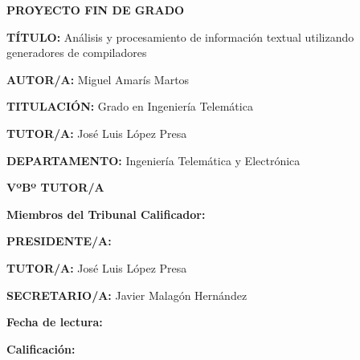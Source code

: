 \vspace{6,5cm}
\begin{center}
	{\fontsize{20}{24} \textbf{PROYECTO FIN DE GRADO} } \\
	
\end{center}
\vspace{1,3cm}
	\begin{adjustwidth}{3cm}{4cm}
		{\fontsize{11}{13,2} 
			{\textbf{TÍTULO:}  Análisis y procesamiento de información textual utilizando
				generadores de compiladores }\vspace{19pt}


			{\textbf{AUTOR/A:} Miguel Amarís Martos}\vspace{19pt}

			{\textbf{TITULACIÓN:} Grado en Ingeniería Telemática}\vspace{19pt}


			{\textbf{TUTOR/A:} José Luis López Presa} \vspace{19pt}

			{\textbf{DEPARTAMENTO:} Ingeniería Telemática y Electrónica}\vspace{19pt}

			\hspace*{\fill}	{\textbf{VºBº TUTOR/A}  }\vspace{17pt}

			{\textbf{Miembros del Tribunal Calificador:}}\vspace{19pt}

			{\textbf{PRESIDENTE/A:}}\vspace{19pt}

			{\textbf{TUTOR/A:} José Luis López Presa}\vspace{19pt}

			{\textbf{SECRETARIO/A:} Javier Malagón Hernández}\vspace{19pt}

			{\textbf{Fecha de lectura:}}\vspace{19pt}

			{\textbf{Calificación:} }\vspace{19pt}

			\vspace{19pt}
		}
	\end{adjustwidth}
	
\restoregeometry